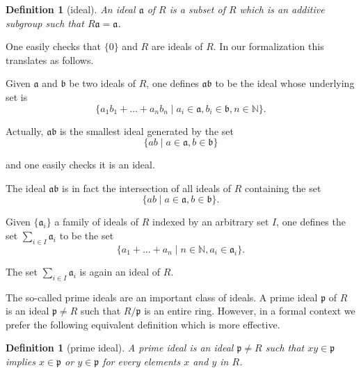 \documentclass[12pt]{scrartcl}
\newtheorem{definition}[proposition]{Definition}
\begin{document}
\begin{definition}[ideal]
	An ideal $\mathfrak{a}$ of $R$ is a subset of $R$ which is an additive subgroup such that $R\mathfrak{a} = \mathfrak{a}$.
\end{definition}


One easily checks that $\lbrace 0 \rbrace$ and $R$ are ideals of $R$. In our formalization this translates as follows.


Given $\mathfrak{a}$ and $\mathfrak{b}$ be two ideals of $R$, one defines $\mathfrak{a} \mathfrak{b}$ to be the ideal whose underlying set is 
\[
	\lbrace a_1 b_1 + \dots + a_n b_n \mid a_i \in \mathfrak{a}, b_i \in \mathfrak{b}, n \in \mathbb{N} \rbrace.
\]

Actually, $\mathfrak{a} \mathfrak{b}$ is the smallest ideal generated by the set 
	\[
	\lbrace a b \mid a \in \mathfrak{a}, b \in \mathfrak{b} \rbrace
	\]
	

and one easily checks it is an ideal.


The ideal $\mathfrak{a} \mathfrak{b}$ is in fact the intersection of all ideals of $R$ containing the set
	\[
	\lbrace a b \mid a \in \mathfrak{a}, b \in \mathfrak{b} \rbrace .
	\]
	

Given $\lbrace \mathfrak{a}_i \rbrace$ a family of ideals of $R$ indexed by an arbitrary set $I$, one defines the set $\displaystyle \sum_{i \in I} \mathfrak{a}_i$ to be the set 
	\[
	\lbrace a_1 + \dots + a_n \mid n \in \mathbb{N}, a_i \in \mathfrak{a}_i \rbrace .
	\]

The set $\displaystyle \sum_{i \in I} \mathfrak{a}_i$ is again an ideal of $R$.	


The so-called prime ideals are an important class of ideals. A prime ideal $\mathfrak{p}$ of $R$ is an ideal $\mathfrak{p} \neq R$ such that $R/\mathfrak{p}$ is an entire ring. However, in a formal context we prefer the following equivalent definition which is more effective.

\begin{definition}[prime ideal]
	A prime ideal is an ideal $\mathfrak{p} \neq R$ such that $x y \in \mathfrak{p}$ implies $x \in \mathfrak{p}$ or $y \in \mathfrak{p}$ for every elements $x$ and $y$ in $R$.
\end{definition}
\end{document}
